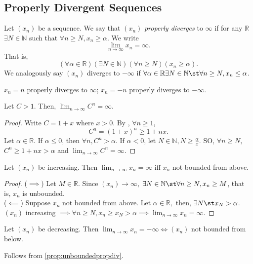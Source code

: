 \documentclass[12pt]{article}
\begin{document}
\subsection{Properly Divergent Sequences}
\begin{definition}
  Let $(x_n)$ be a sequence. We say that $(x_n)$ \emph{properly diverges} to $\infty$ if for any $\mathbb{R}$ $\exists N \in \mathbb{N}$ such that $\forall n \geq N, x_n \geq \alpha$. We write \[\lim_{n\to\infty} x_n = \infty.\] That is, \[(\forall \alpha \in \mathbb{R})(\exists N \in \mathbb{N})(\forall n \geq N)(x_n \geq \alpha).\] We analogously say $(x_n)$ diverges to $- \infty$ if $\forall \alpha \in \mathbb{R} \exists N \in \mathbb{N} \st \forall n \geq N, x_n \leq \alpha$.
\end{definition}

\begin{example}
$x_n = n$ properly diverges to $\infty$; $x_n = -n$ properly diverges to $-\infty$.
\end{example}
\begin{example}
  Let $C > 1$. Then, $\lim_{n\to\infty} C^n = \infty$.
  \begin{proof}
    Write $C = 1 + x$ where $x > 0$. By , $\forall n \geq 1$, \[
    C^n = (1+x)^n \geq 1+nx.  
    \]
    Let $\alpha \in \mathbb{R}$. If $\alpha \leq 0$, then $\forall n, C^n > \alpha$. If $\alpha < 0$, let $N \in \mathbb{N}, N \geq \frac{\alpha}{x}.$ SO, $\forall n \geq N,$ $C^n \geq 1 + nx > \alpha$ and $\lim_{n\to\infty} C^n = \infty$. 
  \end{proof}
\end{example}


\begin{proposition}\label{prop:unboundedpropdiv}
  Let $(x_n)$ be increasing. Then $\lim_{n \to \infty} x_n = \infty$ iff $x_n$ not bounded from above.
\end{proposition}

\begin{proof}
  ($\implies$) Let $M \in \mathbb{R}$. Since $(x_n) \to \infty$, $\exists N \in \mathbb{N} \st \forall n \geq N, x_n \geq M$, that is, $x_n$ is unbounded.\\
  ($\impliedby$) Suppose $x_n$ not bounded from above. Let $\alpha \in \mathbb{R},$ then, $\exists N \st x_N > \alpha$. $(x_n)$ increasing $\implies \forall n \geq N, x_n \geq x_N > \alpha \implies \lim_{n\to\infty} x_n = \infty$.
\end{proof}
\begin{proposition}
  Let $(x_n)$ be decreasing. Then $\lim_{n\to\infty} x_n = - \infty \iff (x_n)$ not bounded from below.
\end{proposition}
\begin{remark}
  Follows from \cref{prop:unboundedpropdiv}.
\end{remark}
\end{document}

